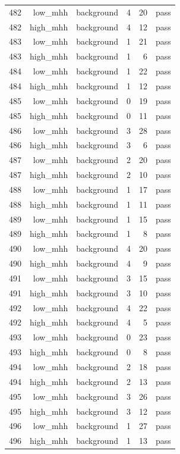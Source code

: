 \begin{table}[htbp]
{\begin{tabular}{lrrrrr}
482 & low\_mhh & background & 4 & 20 & pass \\
482 & high\_mhh & background & 4 & 12 & pass \\
483 & low\_mhh & background & 1 & 21 & pass \\
483 & high\_mhh & background & 1 & 6 & pass \\
484 & low\_mhh & background & 1 & 22 & pass \\
484 & high\_mhh & background & 1 & 12 & pass \\
485 & low\_mhh & background & 0 & 19 & pass \\
485 & high\_mhh & background & 0 & 11 & pass \\
486 & low\_mhh & background & 3 & 28 & pass \\
486 & high\_mhh & background & 3 & 6 & pass \\
487 & low\_mhh & background & 2 & 20 & pass \\
487 & high\_mhh & background & 2 & 10 & pass \\
488 & low\_mhh & background & 1 & 17 & pass \\
488 & high\_mhh & background & 1 & 11 & pass \\
489 & low\_mhh & background & 1 & 15 & pass \\
489 & high\_mhh & background & 1 & 8 & pass \\
490 & low\_mhh & background & 4 & 20 & pass \\
490 & high\_mhh & background & 4 & 9 & pass \\
491 & low\_mhh & background & 3 & 15 & pass \\
491 & high\_mhh & background & 3 & 10 & pass \\
492 & low\_mhh & background & 4 & 22 & pass \\
492 & high\_mhh & background & 4 & 5 & pass \\
493 & low\_mhh & background & 0 & 23 & pass \\
493 & high\_mhh & background & 0 & 8 & pass \\
494 & low\_mhh & background & 2 & 18 & pass \\
494 & high\_mhh & background & 2 & 13 & pass \\
495 & low\_mhh & background & 3 & 26 & pass \\
495 & high\_mhh & background & 3 & 12 & pass \\
496 & low\_mhh & background & 1 & 27 & pass \\
496 & high\_mhh & background & 1 & 13 & pass \\

\end{tabular}}
\end{table}

